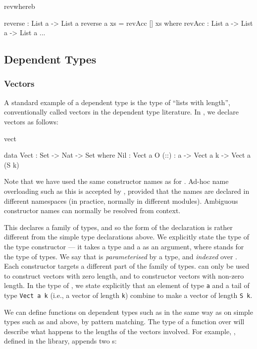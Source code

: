 \begin{SaveVerbatim}{revwhereb}

reverse : List a -> List a
reverse {a} xs = revAcc [] xs where
  revAcc : List a -> List a -> List a
  ...

\end{SaveVerbatim}

\subsection{Dependent Types}

\subsubsection{Vectors}

A standard example of a dependent type is the type of ``lists with length'',
conventionally called vectors in the dependent type literature. In \Idris{},
we declare vectors as follows:

\begin{SaveVerbatim}{vect}

data Vect : Set -> Nat -> Set where
   Nil  : Vect a O
   (::) : a -> Vect a k -> Vect a (S k)

\end{SaveVerbatim}

\noindent
Note that we have used the same constructor names as for . Ad-hoc
name overloading such as this is accepted by \Idris{}, provided that the names
are declared in different namespaces (in practice, normally in different modules).
Ambiguous constructor names can normally be resolved from context.

This declares a family of types, and so the form of the declaration is rather
different from the simple type declarations above. We explicitly state the type
of the type constructor  --- it takes a type and a  as an
argument, where  stands for the type of types. We say that 
is \emph{parameterised} by a type, and \emph{indexed} over . Each
constructor targets a different part of the family of types.  can only
be used to construct vectors with zero length, and \tDC{::} to constructor
vectors with non-zero length. In the type of \tDC{::}, we state explicitly that an element
of type \texttt{a} and a tail of type \texttt{Vect a k} (i.e., a vector of length \texttt{k})
combine to make a vector of length \texttt{S k}.

We can define functions on dependent types such as  in the same way
as on simple types such as  and  above, by pattern matching.
The type of a function over  will describe what happens to the
lengths of the vectors involved. For example, \tFN{++}, defined in the
library, appends two s:

